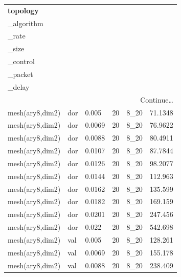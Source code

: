\begin{longtable}[H]{llllll}
\textbf{topology} &
  \textbf{\begin{tabular}[c]{@{}l@{}}routing\\ \_algorithm\end{tabular}} &
  \textbf{\begin{tabular}[c]{@{}l@{}}injection\\ \_rate\end{tabular}} &
  \textbf{\begin{tabular}[c]{@{}l@{}}packet\\ \_size\end{tabular}} &
  \textbf{\begin{tabular}[c]{@{}l@{}}flow\\ \_control\end{tabular}} &
  \textbf{\begin{tabular}[c]{@{}l@{}}average\\ \_packet\\ \_delay\end{tabular}} \\ \hline
\endhead %
\hline
\multicolumn{6}{r}{Continue…}\\
\endfoot %
\hline
\endlastfoot%
mesh(ary8,dim2) & dor        & 0.005  & 20 & 8\_20 & 71.1348 \\
mesh(ary8,dim2) & dor        & 0.0069 & 20 & 8\_20 & 76.9622 \\
mesh(ary8,dim2) & dor        & 0.0088 & 20 & 8\_20 & 80.4911 \\
mesh(ary8,dim2) & dor        & 0.0107 & 20 & 8\_20 & 87.7844 \\
mesh(ary8,dim2) & dor        & 0.0126 & 20 & 8\_20 & 98.2077 \\
mesh(ary8,dim2) & dor        & 0.0144 & 20 & 8\_20 & 112.963 \\
mesh(ary8,dim2) & dor        & 0.0162 & 20 & 8\_20 & 135.599 \\
mesh(ary8,dim2) & dor        & 0.0182 & 20 & 8\_20 & 169.159 \\
mesh(ary8,dim2) & dor        & 0.0201 & 20 & 8\_20 & 247.456 \\
mesh(ary8,dim2) & dor        & 0.022  & 20 & 8\_20 & 542.698 \\ \hline
mesh(ary8,dim2) & val        & 0.005  & 20 & 8\_20 & 128.261 \\
mesh(ary8,dim2) & val        & 0.0069 & 20 & 8\_20 & 155.178 \\
mesh(ary8,dim2) & val        & 0.0088 & 20 & 8\_20 & 238.409 \\

\end{longtable}
